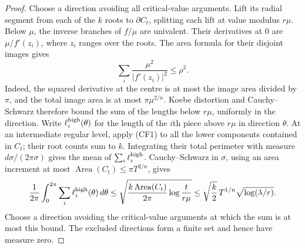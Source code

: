 \documentclass[11pt]{article}
\begin{document}
\begin{proof}
Choose a direction avoiding all critical-value arguments. Lift its radial
segment from each of the $k$ roots to $\partial C_t$, splitting each lift
at value modulus $r\mu$. Below $\mu$, the inverse branches of $f/\mu$
are univalent. Their derivatives at $0$ are $\mu/f'(z_i)$, where $z_i$
ranges over the roots. The area formula for their disjoint images gives
\[
 \sum_i\frac{\mu^2}{|f'(z_i)|^2}\le\rho^2.        \tag{CF2}
\]
Indeed, the squared derivative at the centre is at most the image area
divided by $\pi$, and the total image area is at most $\pi\mu^{2/n}$.
Koebe distortion and Cauchy--Schwarz therefore bound the sum of the
lengths below $r\mu$, uniformly in the direction. Write
$\ell_i^{\rm high}(\theta)$ for the length of the $i$th piece above
$r\mu$ in direction $\theta$. At an intermediate regular level, apply
(CF1) to all the lower components contained in $C_t$; their root counts
sum to $k$. Integrating their total perimeter with measure
$d\sigma/(2\pi\sigma)$ gives the mean of $\sum_i\ell_i^{\rm high}$.
Cauchy--Schwarz in $\sigma$, using an area increment at most
$\operatorname{Area}(C_t)\le\pi T^{2/n}$, gives
\[
 \frac1{2\pi}\int_0^{2\pi}\sum_i\ell_i^{\rm high}(\theta)\,d\theta
 \le\sqrt{\frac{k\operatorname{Area}(C_t)}{2\pi}
                   \log\frac{t}{r\mu}}
 \le\sqrt{\frac k2}\,T^{1/n}\sqrt{\log(\lambda/r)}.
\]
Choose a direction avoiding the critical-value arguments at which the
sum is at most this bound. The excluded directions form a finite set
and hence have measure zero.


\end{proof}
\end{document}
